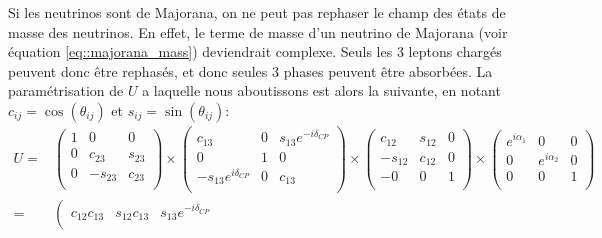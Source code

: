             Si les neutrinos sont de Majorana, on ne peut pas rephaser le champ des états de masse des neutrinos. En effet, le terme de masse d'un neutrino de Majorana (voir équation \eqref{eq::majorana_mass}) deviendrait complexe. Seuls les 3 leptons chargés peuvent donc être rephasés, et donc seules 3 phases peuvent être absorbées. La paramétrisation de $U$ a laquelle nous aboutissons est alors la suivante, en notant $c_{ij}=\cos(\theta_{ij})$ et $s_{ij}=\sin(\theta_{ij})$: 
            \begin{eqnarray}
                U= & 
                \left(\begin{matrix}
                        1   &    0    &    0   \\
                        0   & c_{23}  & s_{23} \\
                        0   & -s_{23} & c_{23} \\
                \end{matrix}\right)\times
                \left(\begin{matrix}
                    c_{13}  &    0    & s_{13}e^{-i\delta_{CP}} \\
                        0   &    1    &    0   \\
    -s_{13}e^{i\delta_{CP}} &    0    & c_{13} \\
                \end{matrix}\right)\times
                \left(\begin{matrix}
                    c_{12}  & s_{12}  &    0   \\
                    -s_{12} & c_{12}  &    0   \\
   -                    0   &    0    &    1   \\
                \end{matrix}\right)\times
                \left(\begin{matrix}
              e^{i\alpha_1} &    0    &    0   \\
                        0   & e^{i\alpha_2} & 0 \\
                        0   & 0 & 1 \\
                \end{matrix}\right) \\\label{eq::pmns}
                =& 
                \left(\begin{matrix}
c_{12}c_{13}                                    & s_{12}c_{13}                                    & s_{13}e^{-i\delta_{CP}} \\

\end{matrix}
\end{eqnarray}
